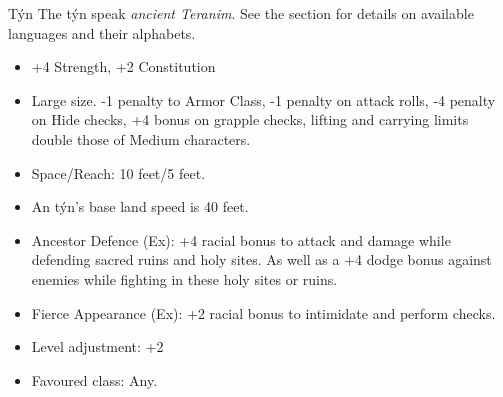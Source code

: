 \begin{35e}{Týn}
  The týn speak \emph{ancient Teranim}. See the section  for details on available languages and their alphabets.

  \begin{itemize}[noitemsep]
    \item +4 Strength, +2 Constitution
    \item Large size. -1 penalty to Armor Class, -1 penalty on attack rolls,
      -4 penalty on Hide checks, +4 bonus on grapple checks, lifting and
      carrying limits double those of Medium characters.
    \item Space/Reach: 10 feet/5 feet.
    \item An týn's base land speed is 40 feet.
    \item Ancestor Defence (Ex): +4 racial bonus to attack and damage while
      defending sacred ruins and holy sites. As well as a +4 dodge bonus
      against enemies while fighting in these holy sites or ruins.
    \item Fierce Appearance (Ex): +2 racial bonus to intimidate and perform
      checks.
    \item Level adjustment: +2
    \item Favoured class: Any.
  \end{itemize}
\end{35e}
